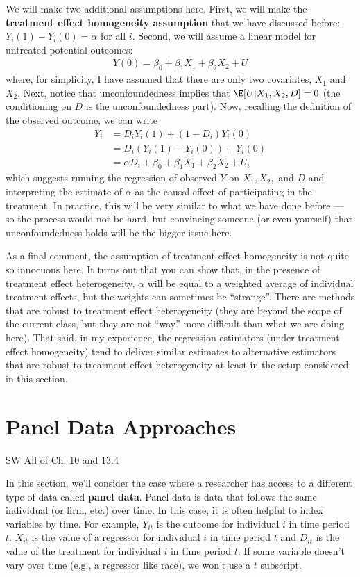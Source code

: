 \documentclass[
  letterpaper,
  DIV=11,
  numbers=noendperiod]{scrreprt}
\begin{document}
We will make two additional assumptions here. First, we will make the
\textbf{treatment effect homogeneity assumption} that we have discussed
before: \(Y_i(1) - Y_i(0) = \alpha\) for all \(i\). Second, we will
assume a linear model for untreated potential outcomes: \begin{align*}
  Y(0) = \beta_0 + \beta_1 X_1 + \beta_2 X_2 + U
\end{align*} where, for simplicity, I have assumed that there are only
two covariates, \(X_1\) and \(X_2\). Next, notice that unconfoundedness
implies that \(\E[U|X_1,X_2,D] = 0\) (the conditioning on \(D\) is the
unconfoundedness part). Now, recalling the definition of the observed
outcome, we can write \begin{align*}
  Y_i &= D_i Y_i(1) + (1-D_i) Y_i(0) \\
  &= D_i (Y_i(1) - Y_i(0)) + Y_i(0) \\
  &= \alpha D_i + \beta_0 + \beta_1 X_1 + \beta_2 X_2 + U_i
\end{align*} which suggests running the regression of observed \(Y\) on
\(X_1,X_2,\) and \(D\) and interpreting the estimate of \(\alpha\) as
the causal effect of participating in the treatment. In practice, this
will be very similar to what we have done before --- so the process
would not be hard, but convincing someone (or even yourself) that
unconfoundedness holds will be the bigger issue here.

As a final comment, the assumption of treatment effect homogeneity is
not quite so innocuous here. It turns out that you can show that, in the
presence of treatment effect heterogeneity, \(\alpha\) will be equal to
a weighted average of individual treatment effects, but the weights can
sometimes be ``strange''. There are methods that are robust to treatment
effect heterogeneity (they are beyond the scope of the current class,
but they are not ``way'' more difficult than what we are doing here).
That said, in my experience, the regression estimators (under treatment
effect homogeneity) tend to deliver similar estimates to alternative
estimators that are robust to treatment effect heterogeneity at least in
the setup considered in this section.

\section{Panel Data Approaches}\label{panel-data-approaches}

SW All of Ch. 10 and 13.4

In this section, we'll consider the case where a researcher has access
to a different type of data called \textbf{panel data}. Panel data is
data that follows the same individual (or firm, etc.) over time. In this
case, it is often helpful to index variables by time. For example,
\(Y_{it}\) is the outcome for individual \(i\) in time period \(t\).
\(X_{it}\) is the value of a regressor for individual \(i\) in time
period \(t\) and \(D_{it}\) is the value of the treatment for individual
\(i\) in time period \(t\). If some variable doesn't vary over time
(e.g., a regressor like race), we won't use a \(t\) subscript.
\end{document}
